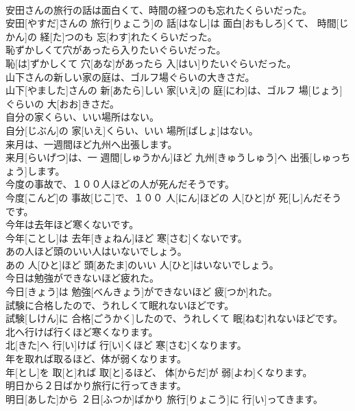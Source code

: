 \documentclass[8pt]{extreport}
\begin{document}
\begin{CJK}{UTF8}{min}
\\	安田さんの旅行の話は面白くて、時間の経つのも忘れたくらいだった。	
\\	安田[やすだ]さんの 旅行[りょこう]の 話[はなし]は 面白[おもしろ]くて、 時間[じかん]の 経[た]つのも 忘[わす]れたくらいだった。	
\\	恥ずかしくて穴があったら入りたいぐらいだった。	
\\	恥[は]ずかしくて 穴[あな]があったら 入[はい]りたいぐらいだった。	
\\	山下さんの新しい家の庭は、ゴルフ場ぐらいの大きさだ。	
\\	山下[やました]さんの 新[あたら]しい 家[いえ]の 庭[にわ]は、ゴルフ 場[じょう]ぐらいの 大[おお]きさだ。	
\\	自分の家くらい、いい場所はない。	
\\	自分[じぶん]の 家[いえ]くらい、いい 場所[ばしょ]はない。	
\\	来月は、一週間ほど九州へ出張します。	
\\	来月[らいげつ]は、一 週間[しゅうかん]ほど 九州[きゅうしゅう]へ 出張[しゅっちょう]します。	
\\	今度の事故で、１００人ほどの人が死んだそうです。	
\\	今度[こんど]の 事故[じこ]で、１００ 人[にん]ほどの 人[ひと]が 死[し]んだそうです。	
\\	今年は去年ほど寒くないです。	
\\	今年[ことし]は 去年[きょねん]ほど 寒[さむ]くないです。	
\\	あの人ほど頭のいい人はいないでしょう。	
\\	あの 人[ひと]ほど 頭[あたま]のいい 人[ひと]はいないでしょう。	
\\	今日は勉強ができないほど疲れた。	
\\	今日[きょう]は 勉強[べんきょう]ができないほど 疲[つか]れた。	
\\	試験に合格したので、うれしくて眠れないほどです。	
\\	試験[しけん]に 合格[ごうかく]したので、うれしくて 眠[ねむ]れないほどです。	
\\	北へ行けば行くほど寒くなります。	
\\	北[きた]へ 行[い]けば 行[い]くほど 寒[さむ]くなります。	
\\	年を取れば取るほど、体が弱くなります。	
\\	年[とし]を 取[と]れば 取[と]るほど、 体[からだ]が 弱[よわ]くなります。	
\\	明日から２日ばかり旅行に行ってきます。	
\\	明日[あした]から ２日[ふつか]ばかり 旅行[りょこう]に 行[い]ってきます。	

\end{CJK}
\end{document}
